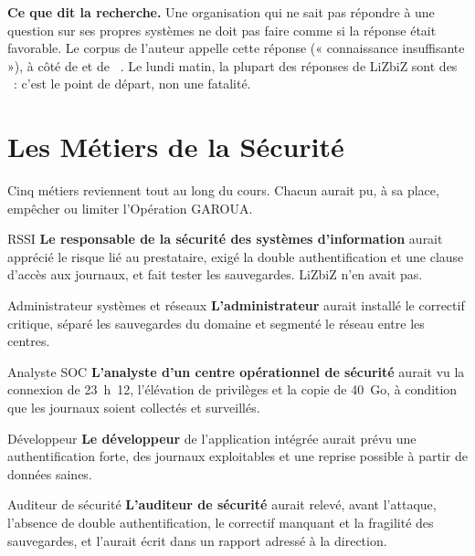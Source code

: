 \begin{boxinfo}
\textbf{Ce que dit la recherche.} Une organisation qui ne sait pas
répondre à une question sur ses propres systèmes ne doit pas faire comme
si la réponse était favorable. Le corpus de l'auteur appelle cette
réponse \NEK{} (« connaissance insuffisante »), à côté de \OUI{} et de
\NON{}~\cite{minka2026nek}. Le lundi matin, la plupart des réponses de
LiZbiZ sont des \NEK{}~: c'est le point de départ, non une fatalité.
\end{boxinfo}

\section{Les Métiers de la Sécurité}
\label{sec:p00-metiers}

Cinq métiers reviennent tout au long du cours. Chacun aurait pu, à sa
place, empêcher ou limiter l'Opération GAROUA.

\begin{boxmetier}{RSSI}
\textbf{Le responsable de la sécurité des systèmes d'information} aurait
apprécié le risque lié au prestataire, exigé la double authentification et
une clause d'accès aux journaux, et fait tester les sauvegardes. LiZbiZ
n'en avait pas.
\end{boxmetier}

\begin{boxmetier}{Administrateur systèmes et réseaux}
\textbf{L'administrateur} aurait installé le correctif critique, séparé les
sauvegardes du domaine et segmenté le réseau entre les centres.
\end{boxmetier}

\begin{boxmetier}{Analyste SOC}
\textbf{L'analyste d'un centre opérationnel de sécurité} aurait vu la
connexion de 23~h~12, l'élévation de privilèges et la copie de 40~Go, à
condition que les journaux soient collectés et surveillés.
\end{boxmetier}

\begin{boxmetier}{Développeur}
\textbf{Le développeur} de l'application intégrée aurait prévu une
authentification forte, des journaux exploitables et une reprise
possible à partir de données saines.
\end{boxmetier}

\begin{boxmetier}{Auditeur de sécurité}
\textbf{L'auditeur de sécurité} aurait relevé, avant l'attaque,
l'absence de double authentification, le correctif manquant et la
fragilité des sauvegardes, et l'aurait écrit dans un rapport adressé à la
direction.
\end{boxmetier}


